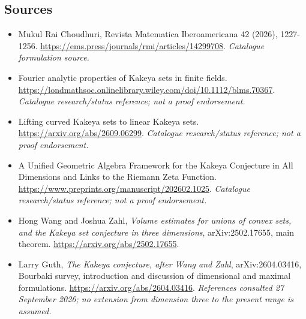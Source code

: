 \documentclass[11pt,a4paper]{article}
\numberwithin{equation}{section}
\begin{document}
\subsection{Sources}
\begin{itemize}\raggedright
\item[\textnormal{[S1]}]\hypertarget{source:38:1}{} Mukul Rai Choudhuri, Revista Matematica Iberoamericana 42 (2026), 1227-1256.
\url{https://ems.press/journals/rmi/articles/14299708}.
{\small\textit{Catalogue formulation source.}}
\item[\textnormal{[S2]}]\hypertarget{source:38:2}{} Fourier analytic properties of Kakeya sets in finite fields.
\url{https://londmathsoc.onlinelibrary.wiley.com/doi/10.1112/blms.70367}.
{\small\textit{Catalogue research/status reference; not a proof endorsement.}}
\item[\textnormal{[S3]}]\hypertarget{source:38:3}{} Lifting curved Kakeya sets to linear Kakeya sets.
\url{https://arxiv.org/abs/2609.06299}.
{\small\textit{Catalogue research/status reference; not a proof endorsement.}}
\item[\textnormal{[S4]}]\hypertarget{source:38:4}{} A Unified Geometric Algebra Framework for the Kakeya Conjecture in All Dimensions and Links to the Riemann Zeta Function.
\url{https://www.preprints.org/manuscript/202602.1025}.
{\small\textit{Catalogue research/status reference; not a proof endorsement.}}
\item[\textnormal{[E1]}]\hypertarget{extra:38:1}{} Hong Wang and Joshua Zahl,
\emph{Volume estimates for unions of convex sets, and the Kakeya set conjecture in three dimensions}, arXiv:2502.17655, main theorem.
\url{https://arxiv.org/abs/2502.17655}.
\item[\textnormal{[E2]}]\hypertarget{extra:38:2}{} Larry Guth,
\emph{The Kakeya conjecture, after Wang and Zahl}, arXiv:2604.03416,
Bourbaki survey, introduction and discussion of dimensional and maximal formulations.
\url{https://arxiv.org/abs/2604.03416}.
{\small\textit{References consulted 27 September 2026; no extension from dimension three to the present range is assumed.}}

\end{itemize}

\end{document}
